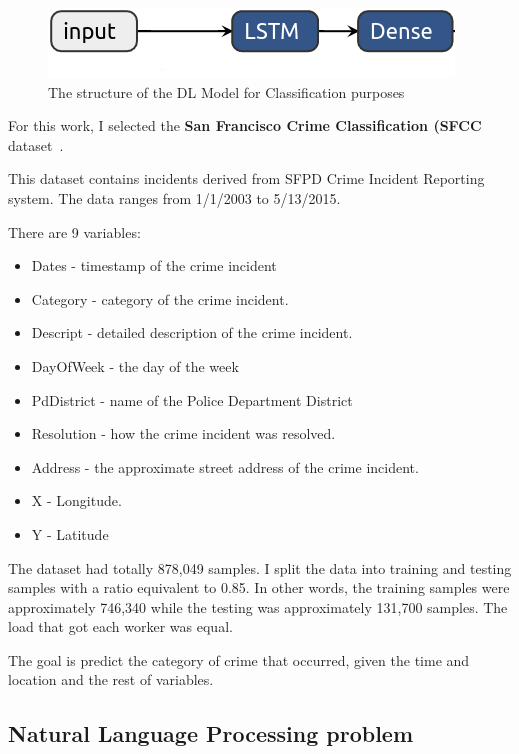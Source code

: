 \begin{figure}[H]
    \centering
    \includegraphics[scale=.3]{./images/impl/class-model.png}
    \caption{The structure of the DL Model for Classification purposes}
    \label{fig:dl_class_model}
\end{figure}

For this work, I selected the \textbf{San Francisco Crime Classification (SFCC} dataset~\cite{sfc_dataset}.

This dataset contains incidents derived from SFPD Crime Incident Reporting system.
The data ranges from 1/1/2003 to 5/13/2015.

There are 9 variables:

\begin{itemize}
    \item Dates - timestamp of the crime incident
    \item Category - category of the crime incident.
    \item Descript - detailed description of the crime incident.
    \item DayOfWeek - the day of the week
    \item PdDistrict - name of the Police Department District
    \item Resolution - how the crime incident was resolved.
    \item Address - the approximate street address of the crime incident.
    \item X - Longitude.
    \item Y - Latitude
\end{itemize}

The dataset had totally 878,049 samples.
I split the data into training and testing samples with a ratio equivalent to 0.85.
In other words, the training samples were approximately 746,340 while the testing was approximately 131,700 samples.
The load that got each worker was equal.

The goal is predict the category of crime that occurred, given the time and location and the rest of variables.

\subsection{Natural Language Processing problem}\label{subsec:natural-language-processing-problem}

